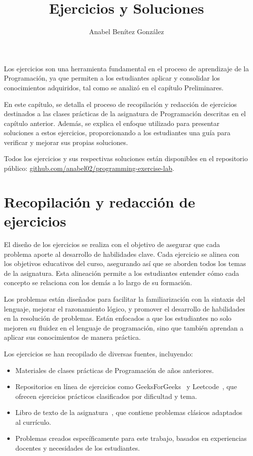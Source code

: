 \documentclass{article}
\title{Ejercicios y Soluciones}
\author{Anabel Benítez González}
\date{}
\begin{document}

\maketitle

Los ejercicios son una herramienta fundamental en el proceso de aprendizaje de la Programación, ya que permiten a los estudiantes aplicar y consolidar los conocimientos adquiridos, tal como se analizó en el capítulo Preliminares. 

En este capítulo, se detalla el proceso de recopilación y redacción de ejercicios destinados a las clases prácticas de la asignatura de Programación descritas en el capítulo anterior. Además, se explica el enfoque utilizado para presentar soluciones a estos ejercicios, proporcionando a los estudiantes una guía para verificar y mejorar sus propias soluciones.

Todos los ejercicios y sus respectivas soluciones están disponibles en el repositorio público: \href{https://github.com/anabel02/programming-exercise-lab}{github.com/anabel02/programming-exercise-lab}.

\section{Recopilación y redacción de ejercicios}
El diseño de los ejercicios se realiza con el objetivo de asegurar que cada problema aporte al desarrollo de habilidades clave. Cada ejercicio se alinea con los objetivos educativos del curso, asegurando así que se aborden todos los temas de la asignatura. Esta alineación permite a los estudiantes entender cómo cada concepto se relaciona con los demás a lo largo de su formación.

Los problemas están diseñados para facilitar la familiarización con la sintaxis del lenguaje, mejorar el razonamiento lógico, y promover el desarrollo de habilidades en la resolución de problemas. Están enfocados a que los estudiantes no solo mejoren su fluidez en el lenguaje de programación, sino que también aprendan a aplicar sus conocimientos de manera práctica. 

Los ejercicios se han recopilado de diversas fuentes, incluyendo:
\begin{itemize}
    \item Materiales de clases prácticas de Programación de años anteriores.
    \item Repositorios en línea de ejercicios como GeeksForGeeks~\cite{geeksforgeeks} y Leetcode~\cite{leetcode}, que ofrecen ejercicios prácticos clasificados por dificultad y tema.
    \item Libro de texto de la asignatura~\cite{katrib_programar}, que contiene problemas clásicos adaptados al currículo.
    \item Problemas creados específicamente para este trabajo, basados en experiencias docentes y necesidades de los estudiantes.
\end{itemize}
\end{document}
